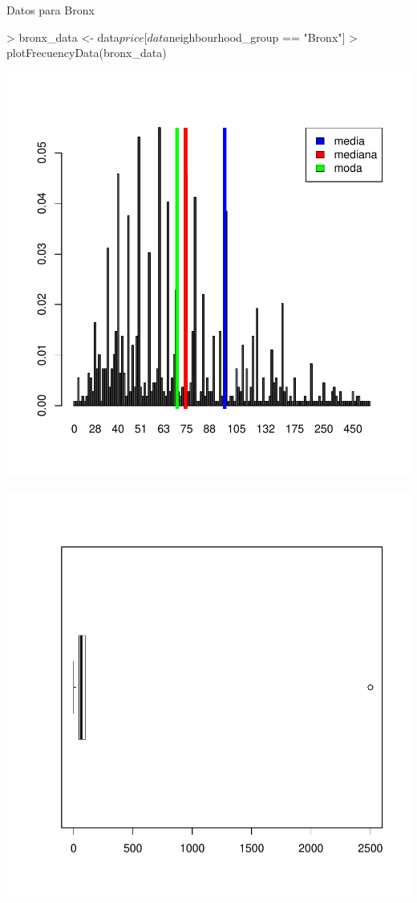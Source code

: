 \documentclass [a4paper] {article}
\begin{document}
\begin{center}
Datos para Bronx
\begin{center}
\begin{Schunk}
\begin{Sinput}
> bronx_data <- data$price[data$neighbourhood_group == "Bronx"]
> plotFrecuencyData(bronx_data)
\end{Sinput}
\end{Schunk}
\includegraphics{entrega-031}
\end{center}
\begin{center}
\includegraphics{entrega-032}
\end{center}


\end{center}
\end{document}

